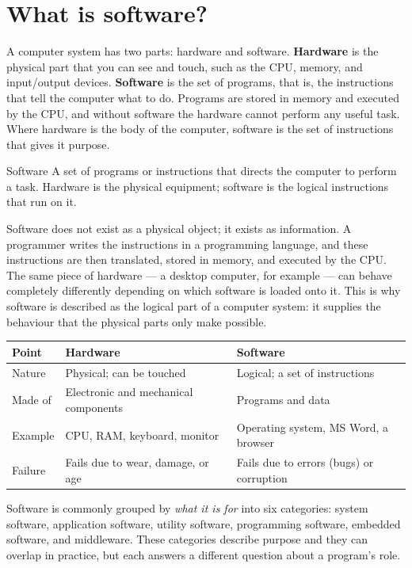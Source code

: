 \section{What is software?}
A computer system has two parts: hardware and software. \textbf{Hardware} is
the physical part that you can see and touch, such as the CPU, memory, and
input/output devices. \textbf{Software} is the set of programs, that is, the
instructions that tell the computer what to do. Programs are stored in memory
and executed by the CPU, and without software the hardware cannot perform any
useful task. Where hardware is the body of the computer, software is the set
of instructions that gives it purpose.

\begin{definitionbox}{Software}
A set of programs or instructions that directs the computer to perform a
task. Hardware is the physical equipment; software is the logical
instructions that run on it.
\end{definitionbox}

Software does not exist as a physical object; it exists as information. A
programmer writes the instructions in a programming language, and these
instructions are then translated, stored in memory, and executed by the CPU.
The same piece of hardware --- a desktop computer, for example --- can behave
completely differently depending on which software is loaded onto it. This is
why software is described as the logical part of a computer system: it
supplies the behaviour that the physical parts only make possible.

\begin{center}
\begin{tabular}{p{}p{}p{}}
\toprule
\textbf{Point} & \textbf{Hardware} & \textbf{Software} \\
\midrule
Nature & Physical; can be touched & Logical; a set of instructions \\
Made of & Electronic and mechanical components & Programs and data \\
Example & CPU, RAM, keyboard, monitor & Operating system, MS Word, a browser \\
Failure & Fails due to wear, damage, or age & Fails due to errors (bugs) or corruption \\
\bottomrule
\end{tabular}
\end{center}

Software is commonly grouped by \emph{what it is for} into six categories:
system software, application software, utility software, programming
software, embedded software, and middleware. These categories describe purpose
and they can overlap in practice, but each answers a different question about
a program's role.

